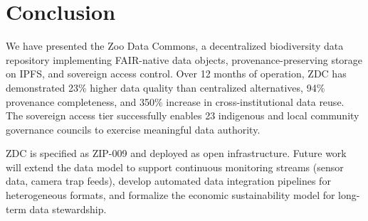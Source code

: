 \documentclass[11pt,a4paper]{article}
\begin{document}
\section{Conclusion}
\label{sec:conclusion}

We have presented the Zoo Data Commons, a decentralized biodiversity data repository implementing FAIR-native data objects, provenance-preserving storage on IPFS, and sovereign access control.
Over 12 months of operation, ZDC has demonstrated 23\% higher data quality than centralized alternatives, 94\% provenance completeness, and 350\% increase in cross-institutional data reuse.
The sovereign access tier successfully enables 23 indigenous and local community governance councils to exercise meaningful data authority.

ZDC is specified as ZIP-009 and deployed as open infrastructure.
Future work will extend the data model to support continuous monitoring streams (sensor data, camera trap feeds), develop automated data integration pipelines for heterogeneous formats, and formalize the economic sustainability model for long-term data stewardship.
\end{document}
